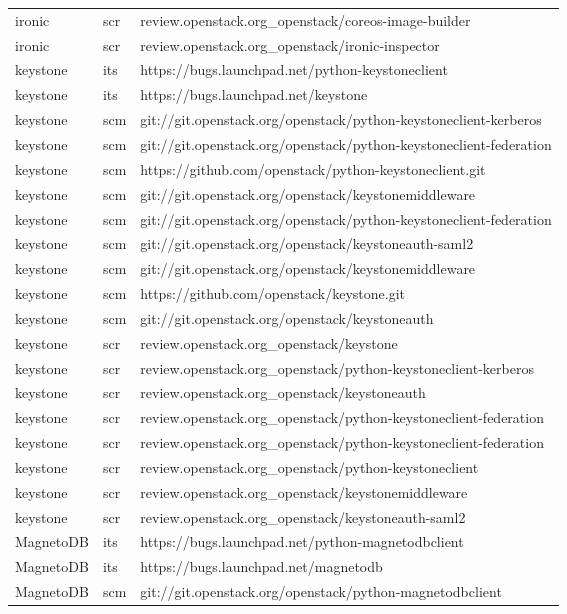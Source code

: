 \begin{center}
\begin{longtable}{|p{4cm}|p{1cm}|p{10cm}|}
ironic&scr&review.openstack.org\_openstack/coreos-image-builder\\ 
ironic&scr&review.openstack.org\_openstack/ironic-inspector\\ 
keystone&its&https://bugs.launchpad.net/python-keystoneclient\\ 
keystone&its&https://bugs.launchpad.net/keystone\\ 
keystone&scm&git://git.openstack.org/openstack/python-keystoneclient-kerberos\\ 
keystone&scm&git://git.openstack.org/openstack/python-keystoneclient-federation\\ 
keystone&scm&https://github.com/openstack/python-keystoneclient.git\\ 
keystone&scm&git://git.openstack.org/openstack/keystonemiddleware\\ 
keystone&scm&git://git.openstack.org/openstack/python-keystoneclient-federation\\ 
keystone&scm&git://git.openstack.org/openstack/keystoneauth-saml2\\ 
keystone&scm&git://git.openstack.org/openstack/keystonemiddleware\\ 
keystone&scm&https://github.com/openstack/keystone.git\\ 
keystone&scm&git://git.openstack.org/openstack/keystoneauth\\ 
keystone&scr&review.openstack.org\_openstack/keystone\\ 
keystone&scr&review.openstack.org\_openstack/python-keystoneclient-kerberos\\ 
keystone&scr&review.openstack.org\_openstack/keystoneauth\\ 
keystone&scr&review.openstack.org\_openstack/python-keystoneclient-federation\\ 
keystone&scr&review.openstack.org\_openstack/python-keystoneclient-federation\\ 
keystone&scr&review.openstack.org\_openstack/python-keystoneclient\\ 
keystone&scr&review.openstack.org\_openstack/keystonemiddleware\\ 
keystone&scr&review.openstack.org\_openstack/keystoneauth-saml2\\ 
MagnetoDB&its&https://bugs.launchpad.net/python-magnetodbclient\\ 
MagnetoDB&its&https://bugs.launchpad.net/magnetodb\\ 
MagnetoDB&scm&git://git.openstack.org/openstack/python-magnetodbclient\\ 

\end{longtable}
\end{center}
